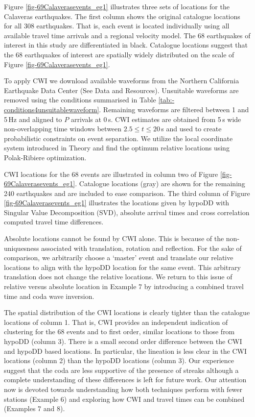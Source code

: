 \documentclass[12pt,double]{article}
\begin{document}
Figure \ref{fig-69Calaverasevents_eg1} illustrates three sets of
locations for the Calaveras earthquakes. The first column shows the
original catalogue locations for all 308 earthquakes. That is, each event
is located individually using all available travel time arrivals and
a regional velocity model. The 68 earthquakes of interest in this
study are differentiated in black. Catalogue locations suggest that
the 68 earthquakes of interest are spatially widely distributed on the scale of
 Figure \ref{fig-69Calaverasevents_eg1}.


To apply CWI we download available waveforms from the Northern
California Earthquake Data Center (See Data and Resources).
Unsuitable waveforms are removed using the conditions summarised in
Table \ref{tab:-conditions4unsuitablewaveform}. Remaining waveforms
are filtered between 1 and 5\,Hz and aligned  to $P$ arrivals at
0\,s. CWI estimates are obtained from 5\,s wide non-overlapping time
windows between $2.5 \leq t \leq 20$\,s and used to create
probabilistic constraints on event separation. We utilize the
local coordinate system introduced in Theory and find the
optimum relative locations using Polak-Ribiere optimization.

CWI locations for the 68 events are illustrated in column two of
Figure \ref{fig-69Calaverasevents_eg1}. Catalogue locations (gray)
are shown for the remaining 240 earthquakes and are included to ease
comparison. The third column of Figure
\ref{fig-69Calaverasevents_eg1} illustrates the locations given by
hypoDD with Singular Value Decomposition (SVD), absolute arrival
times and cross correlation computed travel time differences.

Absolute locations cannot be found by CWI alone. This is because of
the non-uniquesness associated with translation, rotation and
reflection. For the sake of comparison, we arbitrarily choose a
`master' event and translate our relative locations to align with
the hypoDD location for the same event. This arbitrary translation
does not change the relative locations. We return to this issue of
relative versus absolute location in Example 7 by introducing a
combined travel time and coda wave inversion.

The spatial distribution of the CWI locations is clearly tighter
than the catalogue locations of column 1. That is, CWI provides an
independent indication of clustering for the 68 events and to first
order, similar locations to those from hypoDD (column 3). There is a
small second order difference between the CWI and hypoDD based
locations. In particular, the lineation is less clear in the CWI
locations (column 2) than the hypoDD locations (column 3). Our
experience suggest that the coda are less supportive of the presence of
streaks although a complete understanding of these differences is
left for future work. Our attention now is devoted towards
understanding how both techniques perform with fewer stations
(Example 6) and exploring how CWI and travel times can be combined
(Examples 7 and 8).
\end{document}
